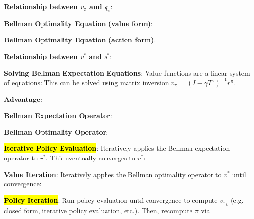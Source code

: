\documentclass{article}
\begin{document}
  \textbf{Relationship between $v_\pi$ and $q_\pi$}:

  \textbf{Bellman Optimality Equation (value form)}:

  \textbf{Bellman Optimality Equation (action form)}:

  \textbf{Relationship between $v^*$ and $q^*$}:

  \textbf{Solving Bellman Expectation Equations}: Value functions are a linear system of equations:
  This can be solved using matrix inversion $v_\pi=(I-\gamma T^\pi)^{-1}r^\pi$. 

  \textbf{Advantage}:

  \textbf{Bellman Expectation Operator}: 

  \textbf{Bellman Optimality Operator}:

  \hl{\textbf{Iterative Policy Evaluation}}: Iteratively applies the Bellman expectation operator to $v^*$. This eventually converges to $v^*$:

  \textbf{Value Iteration}: Iteratively applies the Bellman optimality operator to $v^*$ until convergence:

  \hl{\textbf{Policy Iteration}}: Run policy evaluation until convergence to compute $v_{\pi_k}$ (e.g. closed form, iterative policy evaluation, etc.). Then, recompute $\pi$ via
\end{document}
